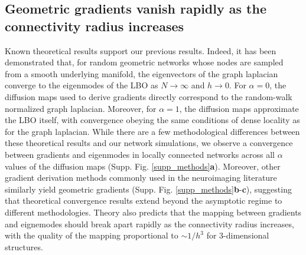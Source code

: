 \documentclass{article}
\begin{document}
\subsection*{Geometric gradients vanish rapidly as the connectivity radius increases}

Known theoretical results support our previous results. Indeed, it has been demonstrated that, for random geometric networks whose nodes are sampled from a smooth underlying manifold, the eigenvectors of the graph laplacian converge to the eigenmodes of the LBO as $N\to \infty$ and $h\to 0$\cite{GarcaTrillos2019}. For $\alpha=0$, the diffusion maps used to derive gradients directly correspond to the random-walk normalized graph laplacian. Moreover, for $\alpha = 1$, the diffusion maps approximate the LBO itself, with convergence obeying the same conditions of dense locality as for the graph laplacian\cite{Coifman2006}. While there are a few methodological differences between these theoretical results and our network simulations, we observe a convergence between gradients and eigenmodes in locally connected networks across all $\alpha$ values of the diffusion maps (Supp. Fig. \ref{supp_methods}\textbf{a}). Moreover, other gradient derivation methods commonly used in the neuroimaging literature similarly yield geometric gradients (Supp. Fig. \ref{supp_methods}\textbf{b}-\textbf{c}), suggesting that theoretical convergence results extend beyond the asymptotic regime to different methodologies. Theory also predicts that the mapping between gradients and eignemodes should break apart rapidly as the connectivity radius increases, with the quality of the mapping proportional to $\sim 1/h^3$ for 3-dimensional structures.
\end{document}
